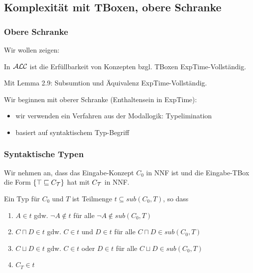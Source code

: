 \subsection{Komplexität mit TBoxen, obere
Schranke}\label{komplexituxe4t-mit-tboxen-obere-schranke}

\subsubsection{Obere Schranke}

Wir wollen zeigen:

\begin{theorem}
In $\mathcal{A}\mathcal{L}\mathcal{C}$ ist die Erfüllbarkeit von Konzepten bzgl. TBoxen
ExpTime-Vollständig.
\end{theorem}

Mit Lemma 2.9: Subsumtion und Äquivalenz ExpTime-Vollständig.

Wir beginnen mit oberer Schranke (Enthaltensein in ExpTime):

\begin{itemize}
  \item wir verwenden ein Verfahren aus der Modallogik: Typelimination
  \item basiert auf syntaktischem Typ-Begriff
\end{itemize}

\subsubsection{Syntaktische Typen}\label{synt-typ}

Wir nehmen an, dass das Eingabe-Konzept $C_0$ in NNF ist und die Eingabe-TBox die Form $\{\top \sqsubseteq C_{\mathcal{T}}\}$ hat mit $C_{\mathcal{T}}$ in NNF.

\begin{definition}[Typ]

Ein Typ für $C_{0}$ und $T$ ist Teilmenge
$t \subseteq sub\left( C_{0},T \right)$, so dass

\begin{enumerate}
\def\labelenumi{\arabic{enumi}.}
\item
  $A \in t$ gdw. $\neg A \notin t$ für alle
  $\neg A \notin sub\left( C_{0},T \right)$
\item
  $C \sqcap D \in t$ gdw. $C \in t$ und $D \in t$ für alle
  $C \sqcap D \in sub\left( C_{0},T \right)$
\item
  $C \sqcup D \in t$ gdw. $C \in t$ oder $D \in t$ für alle
  $C \sqcup D \in sub\left( C_{0},T \right)$
\item
  $C_{T} \in t$
\end{enumerate}
\end{definition}

